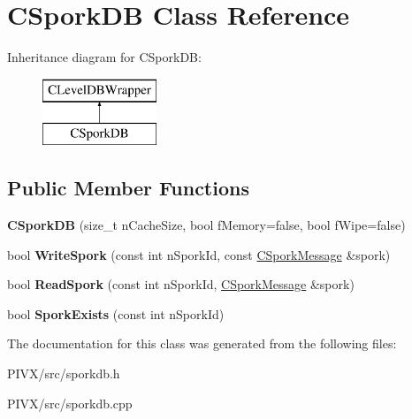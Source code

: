 \hypertarget{class_c_spork_d_b}{}\section{C\+Spork\+DB Class Reference}
\label{class_c_spork_d_b}
Inheritance diagram for C\+Spork\+DB\+:\begin{figure}[H]
\begin{center}
\leavevmode
\includegraphics[height=2.000000cm]{class_c_spork_d_b}
\end{center}
\end{figure}
\subsection*{Public Member Functions}
\begin{DoxyCompactItemize}
\item 
\mbox{\label{class_c_spork_d_b_a85a36bd2aa74e2cd1522ed49e661484f}} 
{\bfseries C\+Spork\+DB} (size\+\_\+t n\+Cache\+Size, bool f\+Memory=false, bool f\+Wipe=false)
\item 
\mbox{\label{class_c_spork_d_b_a642de787a3b991b3ce7d33125ca19828}} 
bool {\bfseries Write\+Spork} (const int n\+Spork\+Id, const \mbox{\hyperlink{class_c_spork_message}{C\+Spork\+Message}} \&spork)
\item 
\mbox{\label{class_c_spork_d_b_a346e545c337070e9f7827c4eb1abcdb1}} 
bool {\bfseries Read\+Spork} (const int n\+Spork\+Id, \mbox{\hyperlink{class_c_spork_message}{C\+Spork\+Message}} \&spork)
\item 
\mbox{\label{class_c_spork_d_b_ae86fb3937491e8509a5d2b7d5b8dbc53}} 
bool {\bfseries Spork\+Exists} (const int n\+Spork\+Id)
\end{DoxyCompactItemize}


The documentation for this class was generated from the following files\+:\begin{DoxyCompactItemize}
\item 
P\+I\+V\+X/src/sporkdb.\+h\item 
P\+I\+V\+X/src/sporkdb.\+cpp\end{DoxyCompactItemize}
